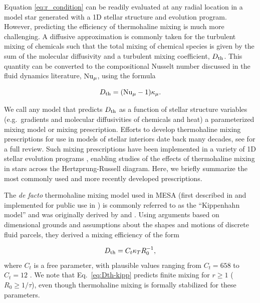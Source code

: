 %
Equation \eqref{eq:r_condition} 
can be readily evaluated at any radial location in a model star generated with a 1D stellar structure and evolution program. However, predicting the efficiency of thermohaline mixing is much more challenging. A diffusive approximation is commonly taken for the turbulent mixing of chemicals such that the total mixing of chemical species is given by the sum of the molecular diffusivity and a turbulent mixing coefficient, $D_\mathrm{th}$. This quantity can be converted to the compositional Nusselt number discussed in the fluid dynamics literature, $\mathrm{Nu}_\mu$, using the formula

\begin{equation} \label{eq:Dth_from_Nu}
    \Dth = (\Numu - 1)\kappa_\mu.
\end{equation}

We call any model that predicts $D_\mathrm{th}$ as a function of stellar structure variables (e.g.~gradients and molecular diffusivities of chemicals and heat) a parameterized mixing model or mixing prescription. 
Efforts to develop thermohaline mixing prescriptions for use in models of stellar interiors date back many decades, see \citet{garaud_DDC_review_2018} for a full review. 
Such mixing prescriptions have been implemented in a variety of 1D stellar evolution programs \citep[see][and references therein]{lattanzio_etal_2015}, enabling studies of the effects of thermohaline mixing in stars across the Hertzprung-Russell diagram. 
Here, we briefly summarize the most commonly used and more recently developed prescriptions.

The \textit{de facto} thermohaline mixing model used in MESA (first described in \citealt{CantielloLanger2010} and implemented for public use in \citealt{mesa2}) is commonly referred to as the ``Kippenhahn model'' and was originally derived by \citet{Ulrich1972} and \citet{kippenhahn_etal_1980}.
Using arguments based on dimensional grounds and assumptions about the shapes and motions of discrete fluid parcels, they derived a mixing efficiency of the form

\begin{equation} \label{eq:Dth-kipp}
    \Dth = C_t \kappa_T R_0^{-1},
\end{equation}
\citep[see Eq.~(5) of][]{charbonnel_thermohaline_2007}
where $C_t$ is a free parameter, with plausible values ranging from $C_t = 658$ \citep{Ulrich1972} to $C_t = 12$ \citep{kippenhahn_etal_1980}. 
We note that Eq.~\eqref{eq:Dth-kipp} predicts finite mixing for $r \geq 1$ ($R_0 \geq 1/\tau$), even though thermohaline mixing is formally stabilized for these parameters.

